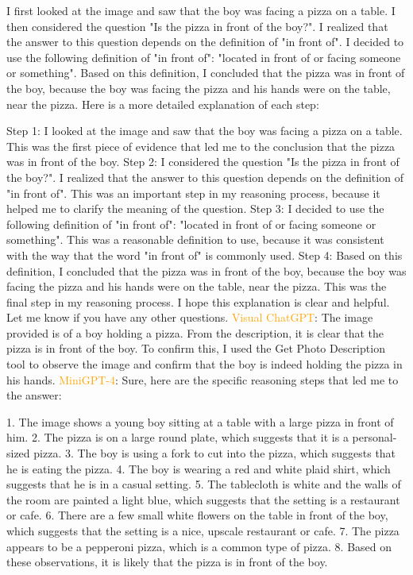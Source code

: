 \begin{enumerate}
        I first looked at the image and saw that the boy was facing a pizza on a table.
        I then considered the question "Is the pizza in front of the boy?". I realized that the answer to this question depends on the definition of "in front of".
        I decided to use the following definition of "in front of": "located in front of or facing someone or something".
        Based on this definition, I concluded that the pizza was in front of the boy, because the boy was facing the pizza and his hands were on the table, near the pizza.
        Here is a more detailed explanation of each step:

        Step 1: I looked at the image and saw that the boy was facing a pizza on a table. This was the first piece of evidence that led me to the conclusion that the pizza was in front of the boy.
        Step 2: I considered the question "Is the pizza in front of the boy?". I realized that the answer to this question depends on the definition of "in front of". This was an important step in my reasoning process, because it helped me to clarify the meaning of the question.
        Step 3: I decided to use the following definition of "in front of": "located in front of or facing someone or something". This was a reasonable definition to use, because it was consistent with the way that the word "in front of" is commonly used.
        Step 4: Based on this definition, I concluded that the pizza was in front of the boy, because the boy was facing the pizza and his hands were on the table, near the pizza. This was the final step in my reasoning process.
        I hope this explanation is clear and helpful. Let me know if you have any other questions.
        \subitem \textcolor{orange}{Visual ChatGPT}: The image provided is of a boy holding a pizza. From the description, it is clear that the pizza is in front of the boy. To confirm this, I used the Get Photo Description tool to observe the image and confirm that the boy is indeed holding the pizza in his hands.
        \subitem \textcolor{orange}{MiniGPT-4}: Sure, here are the specific reasoning steps that led me to the answer:

        1. The image shows a young boy sitting at a table with a large pizza in front of him.
        2. The pizza is on a large round plate, which suggests that it is a personal-sized pizza.
        3. The boy is using a fork to cut into the pizza, which suggests that he is eating the pizza.
        4. The boy is wearing a red and white plaid shirt, which suggests that he is in a casual setting.
        5. The tablecloth is white and the walls of the room are painted a light blue, which suggests that the setting is a restaurant or cafe.
        6. There are a few small white flowers on the table in front of the boy, which suggests that the setting is a nice, upscale restaurant or cafe.
        7. The pizza appears to be a pepperoni pizza, which is a common type of pizza.
        8. Based on these observations, it is likely that the pizza is in front of the boy.
    \end{enumerate}
